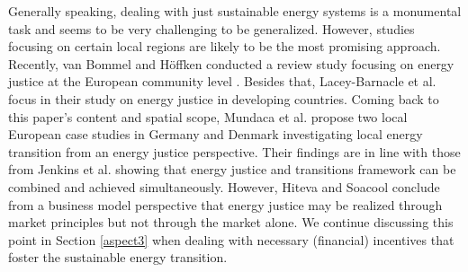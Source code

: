 Generally speaking, dealing with just sustainable energy systems is a monumental task and seems to be very challenging to be generalized. However, studies focusing on certain local regions are likely to be the most promising approach. Recently, van Bommel and Höffken conducted a review study focusing on energy justice at the European community level \cite{van2021energy}. Besides that, Lacey-Barnacle et al. \cite{lacey2020energy} focus in their study on energy justice in developing countries. Coming back to this paper's content and spatial scope, Mundaca et al. \cite{mundaca2018successful} propose two local European case studies in Germany and Denmark investigating local energy transition from an energy justice perspective. Their findings are in line with those from Jenkins et al. \cite{jenkins2018humanizing} showing that energy justice and transitions framework can be combined and achieved simultaneously. However, Hiteva and Soacool \cite{hiteva2017harnessing} conclude from a business model perspective that energy justice may be realized through market principles but not through the market alone. We continue discussing this point in Section \ref{aspect3} when dealing with necessary (financial) incentives that foster the sustainable energy transition. \vspace{0.5cm} 

